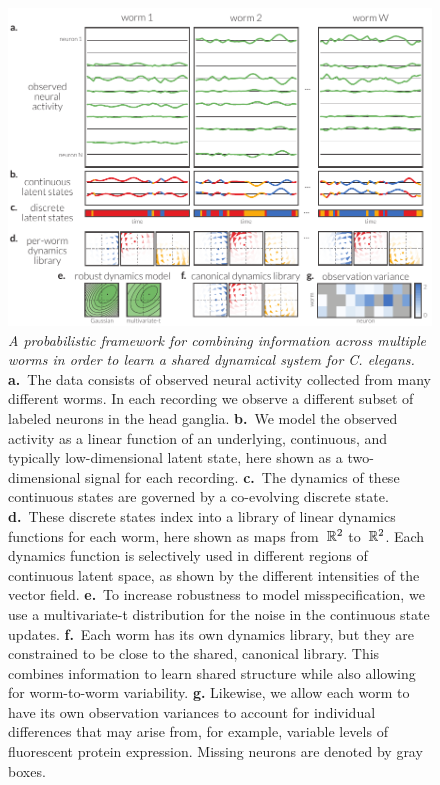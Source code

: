 \documentclass[11pt]{article}
\newcommand{\celegans}{\textit{C. elegans}}
\begin{document}
\begin{figure}[t!]
\centering%
\includegraphics[width=6in]{figures/v3/figure1} 
\caption{
  \textit{A probabilistic framework for combining
  information across multiple worms in order to learn a shared
  dynamical system for \celegans.}
  \textbf{a.}~The data consists of observed neural activity collected
  from many different worms.  In each recording we observe a different
  subset of labeled neurons in the head ganglia.
  \textbf{b.}~We model the observed activity as a linear function of
  an underlying, continuous, and typically low-dimensional latent state,
  here shown as a two-dimensional signal for each recording.
  \textbf{c.}~The dynamics of these continuous states are governed by
  a co-evolving discrete state.
  \textbf{d.}~These discrete states index into a library of linear
  dynamics functions for each worm, here shown as maps from~$\mathbb{R}^2$ to~$\mathbb{R}^2$.
  Each dynamics function is selectively used in different regions of
  continuous latent space, as shown by the different intensities of
  the vector field.
  \textbf{e.}~To increase robustness to model misspecification, we
  use a multivariate-t distribution for the noise in the continuous
  state updates.
  \textbf{f.}~Each worm has its own dynamics library, but they are
  constrained to be close to the shared, canonical library.  This
  combines information to learn shared structure while also allowing
  for worm-to-worm variability.
  \textbf{g.} Likewise, we allow each worm to have its own observation
  variances to account for individual differences that may arise from,
  for example, variable levels of fluorescent protein expression.
  Missing neurons are denoted by gray boxes. 
}
\label{fig:model}
\end{figure}
\end{document}
